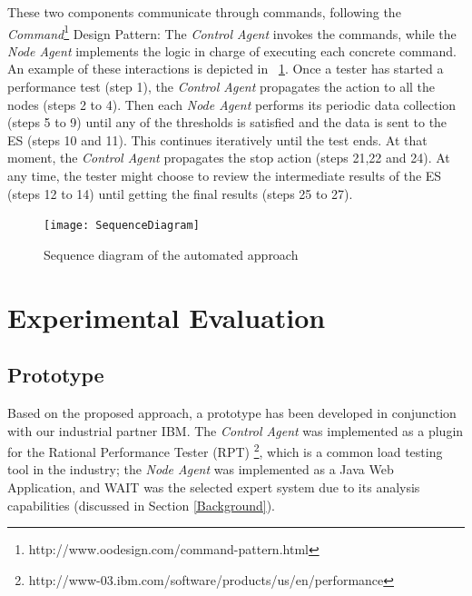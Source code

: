 \documentclass[runningheads,a4paper]{llncs}
\newcommand{\myspaceM}{-7.6pt}
\begin{document}
These two components communicate through commands, following the
\emph{Command}\footnote{http://www.oodesign.com/command-pattern.html} Design
Pattern: The \emph{Control Agent} invokes the commands, while the \emph{Node
Agent} implements the logic in charge of executing each concrete command. An example of
these interactions is depicted in \figurename ~\ref{fig_SeqDiagram}. Once a
tester has started a performance test (step 1), the \emph{Control Agent}
propagates the action to all the nodes (steps 2 to 4). Then each \emph{Node
Agent} performs its periodic data collection (steps 5 to 9) until any of the
thresholds is satisfied and the data is sent to the ES (steps 10 and 11). This
continues iteratively until the test ends. At that moment, the \emph{Control Agent} 
propagates the stop action (steps 21,22 and 24). At any time, the tester might
choose to review the intermediate results of the ES (steps 12 to 14) until
getting the final results (steps 25 to 27).

\begin{figure}[!h]
\centering
\texttt{[image: SequenceDiagram]}
\caption{Sequence diagram of the automated approach}
\label{fig_SeqDiagram}
\end{figure}

\vspace{\myspaceM{}}
\section{Experimental Evaluation}
\label{ExperimentalEvaluation}


\vspace{\myspaceM{}}
\subsection{Prototype}
\vspace{\myspaceM{}}
Based on the proposed approach, a prototype has been developed
in conjunction with our industrial partner IBM. The \emph{Control Agent} was
implemented as a plugin for the Rational Performance Tester (RPT)
\footnote{http://www-03.ibm.com/software/products/us/en/performance}, which is a
common load testing tool in the industry; the \emph{Node Agent}
was implemented as a Java Web Application, and WAIT was the selected expert
system due to its analysis capabilities (discussed in Section \ref{Background}).
\end{document}
